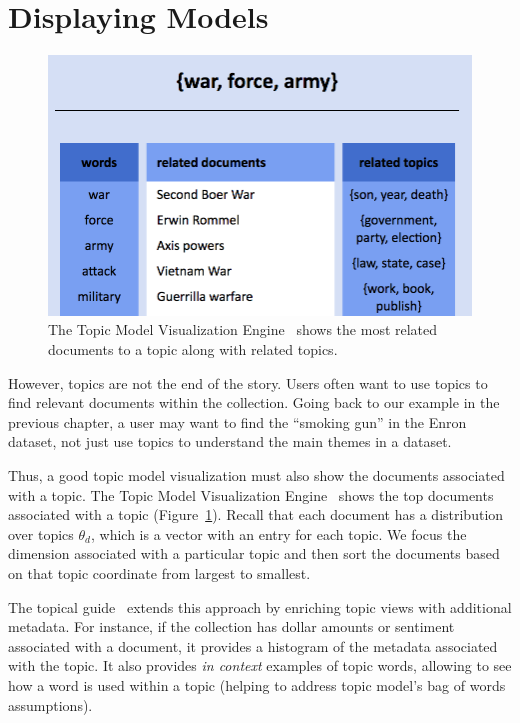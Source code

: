 \section{Displaying Models}

\begin{figure}
  \begin{center}
  \includegraphics[width=.8\linewidth]{figures/viz_tmve}
  \end{center}
  \caption{The Topic Model Visualization Engine~\citep{chaney-12}
    shows the most related documents to a topic along with related topics. }
  \label{fig:tmve}
\end{figure}

However, topics are not the end of the story.  Users often want to use topics to
find relevant documents within the collection.  Going back to our example in the
previous chapter, a user may want to find the ``smoking gun'' in the Enron
dataset, not just use topics to understand the main themes in a dataset.

Thus, a good topic model visualization must also show the documents associated
with a topic.  The Topic Model Visualization Engine~\citep{chaney-12} shows the
top documents associated with a topic (Figure~\ref{fig:tmve}).  Recall that each
document has a distribution over topics $\theta_d$, which is a vector with an
entry for each topic.  We focus the dimension associated with a particular topic
and then sort the documents based on that topic coordinate from largest to
smallest.

The topical guide~\citep{gardner-10} extends this approach by enriching topic
views with additional metadata.  For instance, if the collection has dollar
amounts or sentiment~\cite{pang-08} associated with a document, it provides a
histogram of the metadata associated with the topic.  It also provides \emph{in
  context} examples of topic words, allowing to see how a word is used within a
topic (helping to address topic model's bag of words assumptions).

